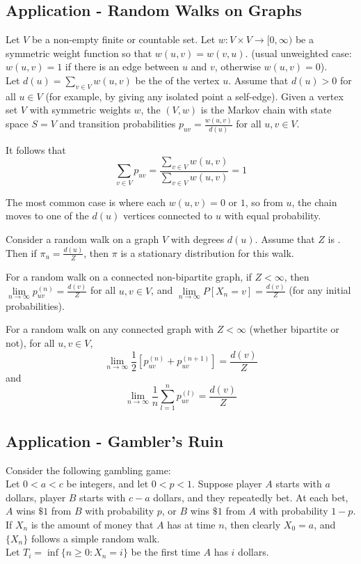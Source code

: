 \documentclass[11pt]{article}
\newcommand{\dur}[3]{{#1}_{#2}^{({#3})}}
\renewcommand{\limit}[1]{\underset{{#1} \rightarrow \infty}{\lim}}
\begin{document}
    \subsection{Application - Random Walks on Graphs}
    Let $V$ be a non-empty finite or countable set. Let $w: V \times V \rightarrow [0, \infty)$ be a symmetric weight function so that $w(u,v) = w(v,u)$. (usual unweighted case: $w(u, v) = 1$ if there is an edge between $u$ and $v$, otherwise $w(u,v) = 0$).\\
    Let $d(u) = \sum_{v \in V} w(u,v)$ be the  of the vertex $u$. Assume that $d(u) > 0$ for all $u \in V$ (for example, by giving any isolated point a self-edge).
    Given a vertex set $V$ with symmetric weights $w$, the  $(V, w)$ is the Markov chain with state space $S = V$ and transition probabilities $p_{uv} = \frac{w(u,v)}{d(u)}$ for all $u, v \in V$.
    
    \remark
    It follows that 
    $$\sum_{v \in V} p_{uv} = \frac{\sum_{v \in V}w(u, v)}{\sum_{v \in V}w(u,v)} = 1$$
    
    \remark
    The most common case is where each $w(u,v) = 0$ or $1$, so from $u$, the chain moves to one of the $d(u)$ vertices connected to $u$ with equal probability.
    
    Consider a random walk on a graph $V$ with degrees $d(u)$. Assume that $Z$ is . Then if $\pi_u = \frac{d(u)}{Z}$, then $\pi$ is a stationary distribution for this walk. 
    
     For a random walk on a connected non-bipartite graph, if $Z < \infty$, then $\limit{n} \dur{p}{uv}{n} = \frac{d(v)}{Z}$ for all $u, v \in V$, and $\limit{n} P[X_n = v] = \frac{d(v)}{Z}$ (for any initial probabilities).
    
     For a random walk on any connected graph with $Z < \infty$ (whether bipartite or not), for all $u, v \in V$, 
    $$\limit{n} \frac{1}{2}[\dur{p}{uv}{n} + \dur{p}{uv}{n+1}] = \frac{d(v)}{Z}$$
    and
    $$\limit{n} \frac{1}{n}\sum_{l=1}^n \dur{p}{uv}{l} = \frac{d(v)}{Z}$$
    
    \subsection{Application - Gambler's Ruin}
    Consider the following gambling game: \\
    Let $0 < a < c$ be integers, and let $0 < p < 1$. Suppose player $A$ starts with $a$ dollars, player $B$ starts with $c - a$ dollars, and they repeatedly bet. At each bet, $A$ wins $\$1$ from $B$ with probability $p$, or $B$ wins $\$ 1$ from $A$ with probability $1 - p$.\\
    If $X_n$ is the amount of money that $A$ has at time $n$, then clearly $X_0 = a$, and $\{X_n\}$ follows a simple random walk.\\
    Let $T_i = \inf\{n \geq 0: X_n = i\}$ be the first time $A$ has $i$ dollars.
\end{document}
